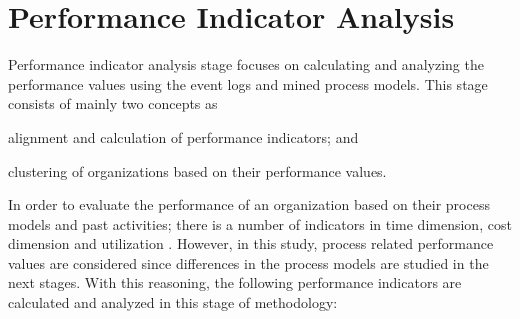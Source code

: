 \section{Performance Indicator Analysis}
\label{sec:performance-indicator-analysis}
Performance indicator analysis stage focuses on calculating and analyzing the performance values using the event logs and mined process models. This stage consists of mainly two concepts as 
\begin{inparaenum}
\item alignment and calculation of performance indicators; and
\item clustering of organizations based on their performance values.
\end{inparaenum}
In order to evaluate the performance of an organization based on their process models and past activities; there is a number of indicators in time dimension, cost dimension and utilization \cite{van2011process}. However, in this study, process related performance values are considered since differences in the process models are studied in the next stages. With this reasoning, the following performance indicators are calculated and analyzed in this stage of methodology:
